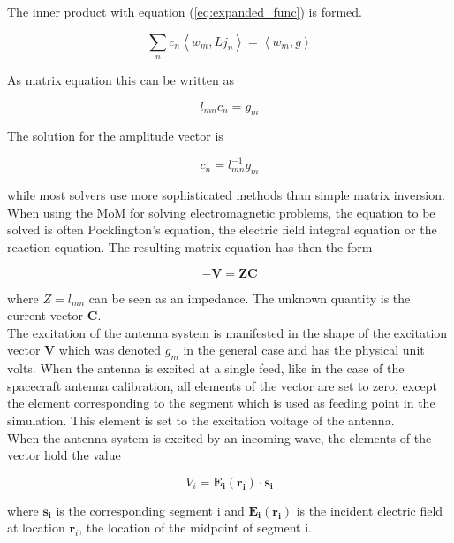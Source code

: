 \documentclass[two-column,ras]{agutex}
\begin{document}
\begin{article}
The inner product with equation (\ref{eq:expanded_func}) is formed.

\begin{equation}
 \sum_{n} c_n \left\langle w_m, L j_n\right\rangle = \left\langle w_m, g \right\rangle
\end{equation}

As matrix equation this can be written as

\begin{equation}
 l_{mn}c_n=g_m
\end{equation}

The solution for the amplitude vector is

\begin{equation}
 c_n=l_{mn}^{-1}g_m
\end{equation}

while most solvers use more sophisticated methods than simple matrix inversion.\\

When using the MoM for solving electromagnetic problems, the equation to be solved is often Pocklington's equation, the electric field integral equation or the reaction equation. The resulting matrix equation has then the form


\begin{equation}\label{eq:mom}
- \mathbf{V}=\mathbf{ZC}
\end{equation}

where $Z=l_{mn}$ can be seen as an impedance. The unknown quantity is the current vector $\mathbf{C}$. \\

The excitation of the antenna system is manifested in the shape of the excitation vector $\mathbf{V}$ which was denoted $g_m$ in the general case and has the physical unit volts. When the antenna is excited at a single feed, like in the case of the spacecraft antenna calibration, all elements of the vector are set to zero, except the element corresponding to the segment which is used as feeding point in the simulation. This element is set to the excitation voltage of the antenna.\\


When the antenna system is excited by an incoming wave, the elements of the vector hold the value

\begin{equation}
 V_i=\mathbf{E_i(r_i)} \cdot \mathbf{s_i}
\end{equation}

where $\mathbf{s_i}$ is the corresponding segment i and $\mathbf{E_i(r_i)}$ is the incident electric field at location $\mathbf{r}_i$, the location of the midpoint of segment i.


\end{article}
\end{document}
